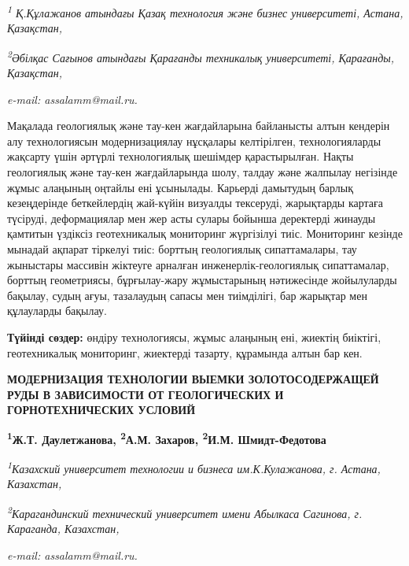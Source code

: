 \begin{affiliation}
\emph{\textsuperscript{1} Қ.Құлажанов атындағы Қазақ технология және бизнес университеті, Астана, Қазақстан,}

\emph{\textsuperscript{2}Әбілқас Сағынов атындағы Қарағанды техникалық университеті, Қарағанды, Қазақстан,}

\emph{e-mail: assalamm@mail.ru.}
\end{affiliation}

Мақалада геологиялық және тау-кен жағдайларына байланысты алтын кендерін
алу технологиясын модернизациялау нұсқалары келтірілген, технологияларды
жақсарту үшін әртүрлі технологиялық шешімдер қарастырылған. Нақты
геологиялық және тау-кен жағдайларында шолу, талдау және жалпылау
негізінде жұмыс алаңының оңтайлы ені ұсынылады. Карьерді дамытудың
барлық кезеңдерінде беткейлердің жай-күйін визуалды тексеруді,
жарықтарды картаға түсіруді, деформациялар мен жер асты сулары бойынша
деректерді жинауды қамтитын үздіксіз геотехникалық мониторинг жүргізілуі
тиіс. Мониторинг кезінде мынадай ақпарат тіркелуі тиіс: борттың
геологиялық сипаттамалары, тау жыныстары массивін жіктеуге арналған
инженерлік-геологиялық сипаттамалар, борттың геометриясы, бұрғылау-жару
жұмыстарының нәтижесінде жойылуларды бақылау, судың ағуы, тазалаудың
сапасы мен тиімділігі, бар жарықтар мен құлауларды бақылау.

{\bfseries Түйінді сөздер:} өндіру технологиясы, жұмыс алаңының ені, жиектің
биіктігі, геотехникалық мониторинг, жиектерді тазарту, құрамында алтын
бар кен.

\begin{articleheader}
{\bfseries МОДЕРНИЗАЦИЯ ТЕХНОЛОГИИ ВЫЕМКИ ЗОЛОТОСОДЕРЖАЩЕЙ РУДЫ В ЗАВИСИМОСТИ ОТ ГЕОЛОГИЧЕСКИХ И ГОРНОТЕХНИЧЕСКИХ УСЛОВИЙ}

{\bfseries
\textsuperscript{1}Ж.Т. Даулетжанова,
\textsuperscript{2}А.М. Захаров\textsuperscript{\envelope },
\textsuperscript{2}И.М. Шмидт-Федотова}
\end{articleheader}

\begin{affiliation}
\emph{\textsuperscript{1}Казахский университет технологии и бизнеса им.К.Кулажанова, г. Астана, Казахстан,}

\emph{\textsuperscript{2}Карагандинский технический университет имени Абылкаса Сагинова, г. Караганда, Казахстан,}

\emph{e-mail: assalamm@mail.ru.}
\end{affiliation}

